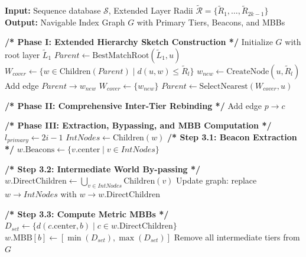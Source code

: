 \documentclass[10pt,runningheads]{llncs}
\begin{document}
\begin{algorithm*}[p]
\caption{Three-Stage Construction Process}
\label{alg:construction}
\small
\begin{algorithmic}[1]
    \setlength{\itemsep}{0.05em}
    \State \textbf{Input:} Sequence database $\mathcal{S}$, Extended Layer Radii $\tilde{\mathcal{R}} = \{\tilde{R}_1, \dots, \tilde{R}_{2k-1}\}$
    \State \textbf{Output:} Navigable Index Graph $G$ with Primary Tiers, Beacons, and MBBs

    \State \textbf{/* Phase I: Extended Hierarchy Sketch Construction */}
    \State Initialize $G$ with root layer $\tilde{L}_1$
        \State $Parent \leftarrow \text{BestMatchRoot}(\tilde{L}_1, u)$
            \State $W_{cover} \leftarrow \{ w \in \text{Children}(Parent) \mid d(u, w) \le \tilde{R}_l \}$
                \State $w_{new} \leftarrow \text{CreateNode}(u, \tilde{R}_l)$
                \State Add edge $Parent \to w_{new}$ 
                \State $W_{cover} \leftarrow \{w_{new}\}$
            \EndIf
            \State $Parent \leftarrow \text{SelectNearest}(W_{cover}, u)$
        \EndFor
    \EndFor

    \State \textbf{/* Phase II: Comprehensive Inter-Tier Rebinding */}
                    \State Add edge $p \to c$ 
                \EndIf
            \EndFor
        \EndFor
    \EndFor

    \State \textbf{/* Phase III: Extraction, Bypassing, and MBB Computation */}
        \State $l_{primary} \leftarrow 2i - 1$
            \State $IntNodes \leftarrow \text{Children}(w)$ 
            \State \textbf{/* Step 3.1: Beacon Extraction */}
            \State $w.\text{Beacons} \leftarrow \{v.\text{center} \mid v \in IntNodes\}$
            
            \State \textbf{/* Step 3.2: Intermediate World By-passing */}
            \State $w.\text{DirectChildren} \leftarrow \bigcup_{v \in IntNodes} \text{Children}(v)$ 
            \State Update graph: replace $w \to IntNodes$ with $w \to w.\text{DirectChildren}$
            
            \State \textbf{/* Step 3.3: Compute Metric MBBs */}
                \State $D_{set} \leftarrow \{ d(c.\text{center}, b) \mid c \in w.\text{DirectChildren} \}$
                \State $w.\text{MBB}[b] \leftarrow [\min(D_{set}), \max(D_{set})]$ 
            \EndFor
        \EndFor
    \EndFor
    \State Remove all intermediate tiers from $G$
\end{algorithmic}
\end{algorithm*}

\label{supp:algorithms}
\end{document}

